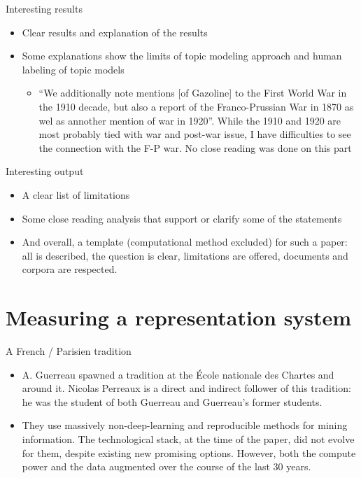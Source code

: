 \documentclass[aspectratio=169]{beamer}
\begin{document}
\begin{frame}{Interesting results}

    \begin{itemize}
        \item Clear results and explanation of the results
        \item Some explanations show the limits of topic modeling approach and human labeling of topic models
        \begin{itemize}
            \item ``We additionally note mentions [of Gazoline] to the First World War in the 1910 decade, but also a report of the Franco-Prussian War in 1870 as wel as annother mention of war in 1920''. While the 1910 and 1920 are most probably tied with war and post-war issue, I have difficulties to see the connection with the F-P war. No close reading was done on this part
        \end{itemize}
    \end{itemize}
    
\end{frame}

\begin{frame}{Interesting output}
    \begin{itemize}
        \item A clear list of limitations
        \item Some close reading analysis that support or clarify some of the statements
        \item And overall, a template (computational method excluded) for such a paper: all is described, the question is clear, limitations are offered, documents and corpora are respected.
    \end{itemize}
\end{frame}

\section{Measuring a representation system}

\begin{frame}{A French / Parisien tradition}

    \begin{itemize}
        \item A. Guerreau spawned a tradition at the École nationale des Chartes and around it. Nicolas Perreaux is a direct and indirect follower of this tradition: he was the student of both Guerreau and Guerreau's former students.
        \item They use massively non-deep-learning and reproducible methods for mining information. The technological stack, at the time of the paper, did not evolve for them, despite existing new promising options. However, both the compute power and the data augmented over the course of the last 30 years. 
    \end{itemize}
    
\end{frame}
\end{document}
